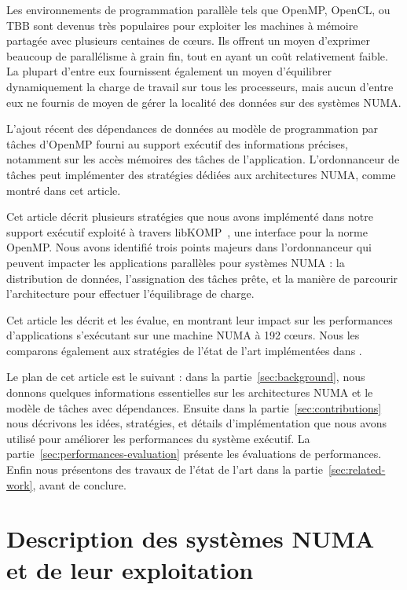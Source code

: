 \documentclass[parallelisme]{compas2016}
\begin{document}
Les environnements de programmation parallèle tels que OpenMP, OpenCL, ou TBB sont devenus très
populaires pour exploiter les machines à mémoire partagée avec plusieurs centaines de cœurs.
Ils offrent un moyen d'exprimer beaucoup de parallélisme à grain fin, tout en
ayant un coût relativement faible. La plupart d'entre eux fournissent également
un moyen d'équilibrer dynamiquement la charge de travail sur tous les processeurs,
mais aucun d'entre eux ne fournis de moyen de gérer la localité
des données sur des systèmes NUMA.

L'ajout récent des dépendances de données au modèle de programmation par tâches
d'OpenMP fourni au support exécutif des informations précises, notamment sur les
accès mémoires des tâches de l'application.
L'ordonnanceur de tâches peut implémenter des stratégies dédiées aux architectures
NUMA, comme montré dans cet article.

Cet article décrit plusieurs stratégies que nous avons implémenté dans notre support
exécutif \kaapi exploité à travers libKOMP~\cite{libkomp}, une interface pour la norme OpenMP.
Nous avons identifié trois points majeurs dans l'ordonnanceur qui
peuvent impacter les applications parallèles pour systèmes NUMA : la distribution
de données, l'assignation des tâches prête, et la manière de parcourir l'architecture
pour effectuer l'équilibrage de charge.

Cet article les décrit et les évalue, en montrant leur impact sur les performances
d'applications s'exécutant sur une machine NUMA à 192 cœurs.
Nous les comparons également aux stratégies de l'état de l'art implémentées dans \kaapi.

Le plan de cet article est le suivant : dans la partie~\ref{sec:background},
nous donnons quelques informations essentielles sur les architectures NUMA et
le modèle de tâches avec dépendances. Ensuite dans la partie~\ref{sec:contributions}
nous décrivons les idées, stratégies, et détails d'implémentation que nous avons
utilisé pour améliorer les performances du système exécutif. La partie~\ref{sec:performances-evaluation}
présente les évaluations de performances. Enfin nous présentons des travaux de l'état
de l'art dans la partie~\ref{sec:related-work}, avant de conclure.


\vspace*{-1ex}
\section{Description des systèmes NUMA et de leur exploitation}
\end{document}
